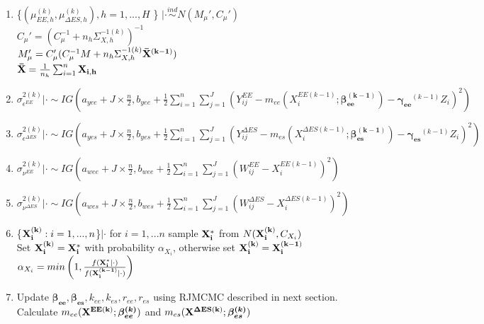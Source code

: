 \documentclass[11pt]{article}\usepackage[]{graphicx}\usepackage[]{color}
\begin{document}
\begin{enumerate}
\begin{enumerate}
\item
 \{$(\mu_{EE,h}^{(k)},\mu_{\Delta ES,h}^{(k)}), h=1,...,H$ \} $|\cdot \overset{ind}{\sim} N(M_{\mu}',C_{\mu}')$ \\
$C_{\mu}' = (C_{\mu}^{-1} + n_h \Sigma_{X,h}^{-1(k)})^{-1}$ \\
$M_{\mu}' = C_{\mu}'(C_{\mu}^{-1}M + n_h \Sigma_{X,h}^{-1(k)} {\bf \bar{X}^{(k-1)}})$ \\
${\bf \bar{X}} = \frac{1}{n_h}\sum_{i=1}^{n} {\bf X_{i,h}}$ \\

\item
 $\sigma^{2(k)}_{\epsilon^{EE}} |\cdot \sim IG(a_{yee}+J\times \frac{n}{2},b_{yee}+\frac{1}{2}\sum_{i=1}^{n}\sum_{j=1}^{J}(Y_{ij}^{EE}-m_{ee}(X_i^{EE(k-1)};\boldsymbol{\beta_{ee}^{(k-1)}})-\boldsymbol{\gamma_{ee}}^{(k-1)}Z_i)^2)$ \\
 

\item
 $\sigma^{2(k)}_{\epsilon^{\Delta ES}} |\cdot \sim IG(a_{yes}+J\times \frac{n}{2},b_{yes}+\frac{1}{2}\sum_{i=1}^{n}\sum_{j=1}^{J}(Y_{ij}^{\Delta ES}-m_{es}(X_i^{\Delta ES(k-1)};\boldsymbol{\beta_{es}^{(k-1)}})-\boldsymbol{\gamma_{es}}^{(k-1)}Z_i)^2)$ \\
 
 
\item
 $\sigma^{2(k)}_{\nu^{EE}} |\cdot \sim IG(a_{wee}+J\times \frac{n}{2},b_{wee}+\frac{1}{2}\sum_{i=1}^{n}\sum_{j=1}^{J}(W_{ij}^{EE}-X_i^{EE(k-1)})^2)$ \\
 
\item
 $\sigma^{2(k)}_{\nu^{\Delta ES}} |\cdot \sim IG(a_{wes}+J\times \frac{n}{2},b_{wes}+\frac{1}{2}\sum_{i=1}^{n}\sum_{j=1}^{J}(W_{ij}^{\Delta ES}-X_i^{\Delta ES(k-1)})^2)$ \\
 

\item
\{${\bf X_i^{(k)}}:i=1,...,n $\}$|\cdot$ for $i=1,...n$ sample ${\bf X_i^*}$ from $N({\bf X_i^{(k)}},C_{X_i})$ \\

Set ${\bf X_i^{(k)}} = {\bf X_i^*}$ with probability $\alpha_{X_i}$, otherwise set ${\bf X_i^{(k)}} = {\bf X_i^{(k-1)}}$ \\

$\alpha_{X_i} = min\left(1, \frac{f({\bf X_i^*}|\cdot)}{f({\bf X_i^{(k-1)}}|\cdot)}  \right)$ \\

\item
Update ${\boldsymbol{\beta_{ee}},\boldsymbol{\beta_{es}}},k_{ee},k_{es}, {  r_{ee}, r_{es}}$ using RJMCMC described in next section. Calculate $m_{ee}({\bf X^{EE(k)}};\boldsymbol{\beta_{ee}^{(k)}})$ and $m_{es}({\bf X^{\Delta ES(k)}};\boldsymbol{\beta_{es}^{(k)}})$ \\



\end{enumerate}
\end{enumerate}
\end{document}
